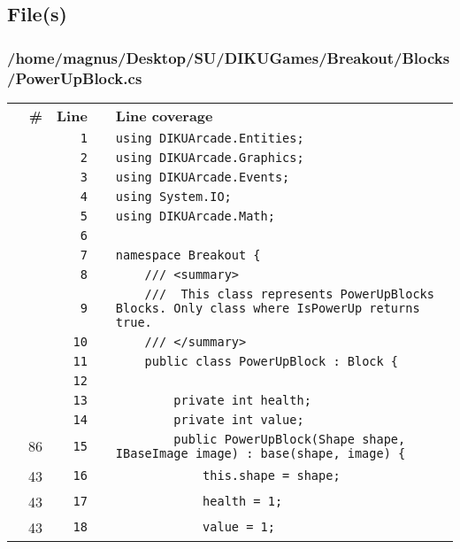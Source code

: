 \documentclass[a4paper,landscape,10pt]{article}
\begin{document}
\subsection{File(s)}
\subsubsection{/home/magnus/Desktop/SU/DIKUGames/Breakout/Blocks/PowerUpBlock.cs}
\begin{longtable}[l]{lrrll}
\textbf{} & \textbf{\#} & \textbf{Line} & \textbf{} & \textbf{Line coverage}\\
\cellcolor{gray} &  & \verb~1~ & & \verb~using DIKUArcade.Entities;~\\
\cellcolor{gray} &  & \verb~2~ & & \verb~using DIKUArcade.Graphics;~\\
\cellcolor{gray} &  & \verb~3~ & & \verb~using DIKUArcade.Events;~\\
\cellcolor{gray} &  & \verb~4~ & & \verb~using System.IO;~\\
\cellcolor{gray} &  & \verb~5~ & & \verb~using DIKUArcade.Math;~\\
\cellcolor{gray} &  & \verb~6~ & & \verb~~\\
\cellcolor{gray} &  & \verb~7~ & & \verb~namespace Breakout {~\\
\cellcolor{gray} &  & \verb~8~ & & \verb~    /// <summary>~\\
\cellcolor{gray} &  & \verb~9~ & & \verb~    ///  This class represents PowerUpBlocks Blocks. Only class where IsPowerUp returns true.~\\
\cellcolor{gray} &  & \verb~10~ & & \verb~    /// </summary>~\\
\cellcolor{gray} &  & \verb~11~ & & \verb~    public class PowerUpBlock : Block {~\\
\cellcolor{gray} &  & \verb~12~ & & \verb~~\\
\cellcolor{gray} &  & \verb~13~ & & \verb~        private int health;~\\
\cellcolor{gray} &  & \verb~14~ & & \verb~        private int value;~\\
\cellcolor{green} & 86 & \verb~15~ & & \verb~        public PowerUpBlock(Shape shape, IBaseImage image) : base(shape, image) {~\\
\cellcolor{green} & 43 & \verb~16~ & & \verb~            this.shape = shape;~\\
\cellcolor{green} & 43 & \verb~17~ & & \verb~            health = 1;~\\
\cellcolor{green} & 43 & \verb~18~ & & \verb~            value = 1;~\\

\end{longtable}
\end{document}
